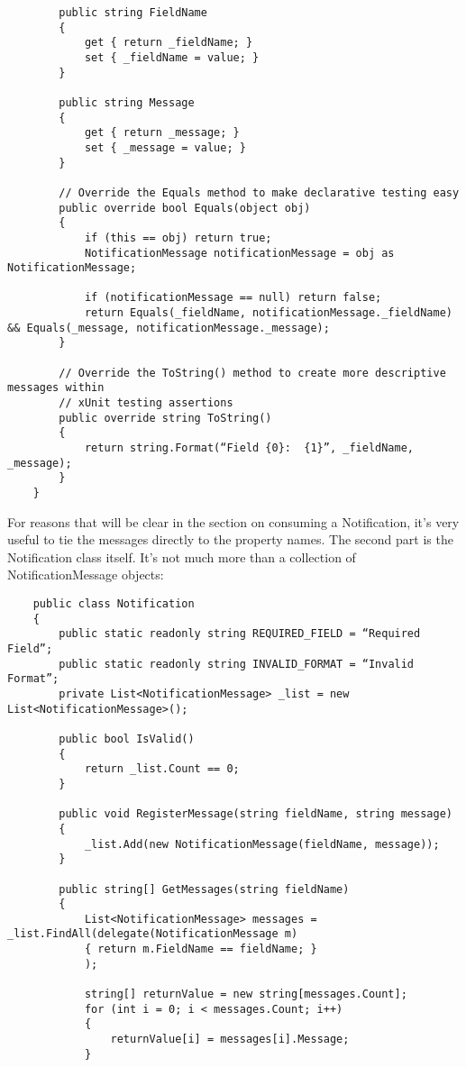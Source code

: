\documentclass{article}
\begin{document}
{\begin{lstlisting}
        public string FieldName
        {
            get { return _fieldName; }
            set { _fieldName = value; }
        }
 
        public string Message
        {
            get { return _message; }
            set { _message = value; }
        }

        // Override the Equals method to make declarative testing easy
        public override bool Equals(object obj)
        {
            if (this == obj) return true;
            NotificationMessage notificationMessage = obj as NotificationMessage;

            if (notificationMessage == null) return false;
            return Equals(_fieldName, notificationMessage._fieldName) && Equals(_message, notificationMessage._message);
        }

        // Override the ToString() method to create more descriptive messages within
        // xUnit testing assertions
        public override string ToString()
        {
            return string.Format(“Field {0}:  {1}”, _fieldName, _message);
        }
    }
\end{lstlisting}	

For reasons that will be clear in the section on consuming a Notification, it's very useful to tie the messages directly to the property names.  The second part is the Notification class itself.  It's not much more than a collection of NotificationMessage objects:
\newpage
\begin{lstlisting}
    public class Notification
    {
        public static readonly string REQUIRED_FIELD = “Required Field”;
        public static readonly string INVALID_FORMAT = “Invalid Format”;
        private List<NotificationMessage> _list = new List<NotificationMessage>(); 

        public bool IsValid()
        {
            return _list.Count == 0;
        } 

        public void RegisterMessage(string fieldName, string message)
        {
            _list.Add(new NotificationMessage(fieldName, message));
        }

        public string[] GetMessages(string fieldName)
        {
            List<NotificationMessage> messages = _list.FindAll(delegate(NotificationMessage m)
			{ return m.FieldName == fieldName; }
			);
			
            string[] returnValue = new string[messages.Count];
            for (int i = 0; i < messages.Count; i++)
            {
                returnValue[i] = messages[i].Message;
            } 


\end{lstlisting}}
\end{document}
